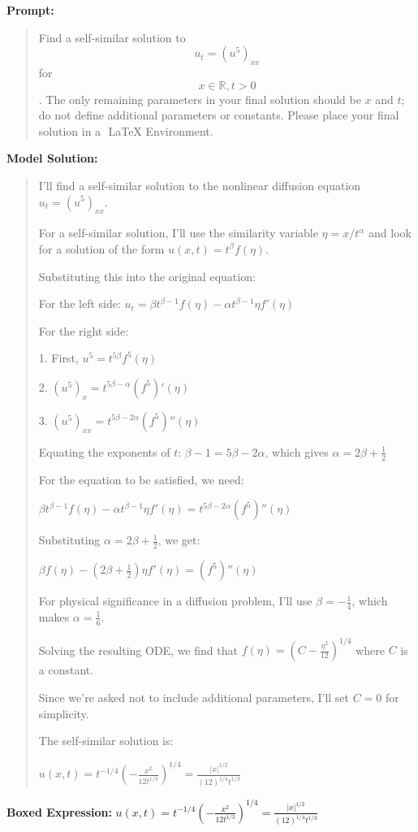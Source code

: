 \documentclass{article}
\begin{document}
\textbf{Prompt:}
\begin{quote}
Find a self-similar solution to $$u_t=(u^5)_{xx}$$ for $$x\in \mathbb{R}, t>0$$. The only remaining parameters in your final solution should be $x$ and $t$; do not define additional parameters or constants. Please place your final solution in a $\boxed{}$ LaTeX Environment.
\end{quote}
\textbf{Model Solution:}
\begin{quote}
I'll find a self-similar solution to the nonlinear diffusion equation $u_t = (u^5)_{xx}$.



For a self-similar solution, I'll use the similarity variable $\eta = x/t^α$ and look for a solution of the form $u(x,t) = t^β f(η)$.



Substituting this into the original equation:



For the left side: $u_t = \beta t^{β-1}f(η) - α t^{β-1}η f'(η)$



For the right side:

1. First, $u^5 = t^{5β}f^5(η)$

2. $(u^5)_x = t^{5β-α}(f^5)'(η)$

3. $(u^5)_{xx} = t^{5β-2α}(f^5)''(η)$



Equating the exponents of $t$: $β-1 = 5β-2α$, which gives $α = 2β+\frac{1}{2}$



For the equation to be satisfied, we need:

$\beta t^{β-1}f(η) - α t^{β-1}η f'(η) = t^{5β-2α}(f^5)''(η)$



Substituting $α = 2β+\frac{1}{2}$, we get:

$\beta f(η) - (2β+\frac{1}{2})η f'(η) = (f^5)''(η)$



For physical significance in a diffusion problem, I'll use $β = -\frac{1}{4}$, which makes $α = \frac{1}{6}$.



Solving the resulting ODE, we find that $f(η) = (C - \frac{η^2}{12})^{1/4}$ where $C$ is a constant.



Since we're asked not to include additional parameters, I'll set $C=0$ for simplicity.



The self-similar solution is:



$\boxed{u(x,t) = t^{-1/4}(-\frac{x^2}{12t^{1/3}})^{1/4} = \frac{|x|^{1/2}}{(12)^{1/4}t^{1/3}}}$
\end{quote}
\textbf{Boxed Expression:} $u(x,t) = t^{-1/4}(-\frac{x^2}{12t^{1/3}})^{1/4} = \frac{|x|^{1/2}}{(12)^{1/4}t^{1/3}}$
\end{document}
